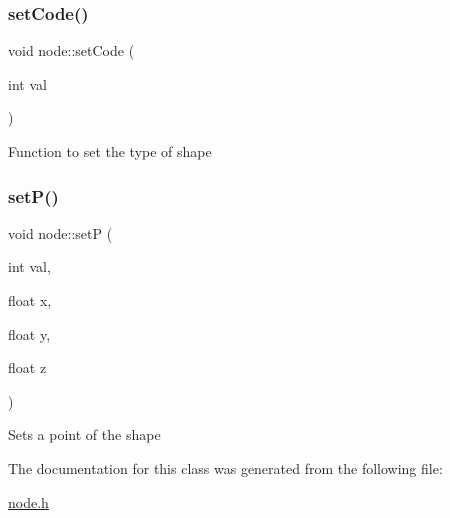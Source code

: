 \subsubsection{\texorpdfstring{set\+Code()}{setCode()}}
{\footnotesize\ttfamily void node\+::set\+Code (\begin{DoxyParamCaption}\item[{int}]{val }\end{DoxyParamCaption})\hspace{0.3cm}{\ttfamily [inline]}}

Function to set the type of shape \mbox{\label{classnode_ac96d4f650585e36edc26172d7f76bea9}} 
\subsubsection{\texorpdfstring{set\+P()}{setP()}}
{\footnotesize\ttfamily void node\+::setP (\begin{DoxyParamCaption}\item[{int}]{val,  }\item[{float}]{x,  }\item[{float}]{y,  }\item[{float}]{z }\end{DoxyParamCaption})\hspace{0.3cm}{\ttfamily [inline]}}

Sets a point of the shape 

The documentation for this class was generated from the following file\+:\begin{DoxyCompactItemize}
\item 
\hyperlink{node_8h}{node.\+h}\end{DoxyCompactItemize}
